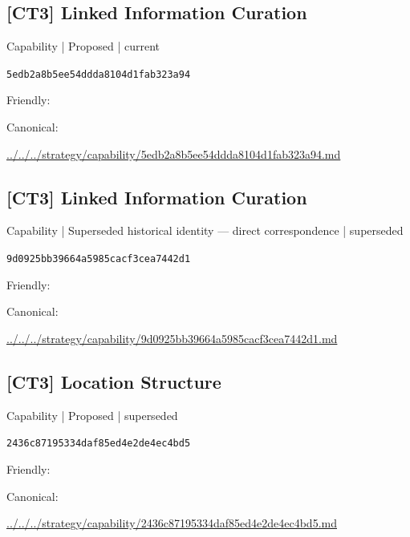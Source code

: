 \documentclass[10pt,a4paper]{article}
\begin{document}
\subsection*{[CT3] Linked Information Curation}
{\small Capability | Proposed | current}\par
\texttt{5edb2a8b5ee54ddda8104d1fab323a94}\par
Friendly: \par
Canonical: \par
{\footnotesize\url{../../../strategy/capability/5edb2a8b5ee54ddda8104d1fab323a94.md}}\par
\subsection*{[CT3] Linked Information Curation}
{\small Capability | Superseded historical identity — direct correspondence | superseded}\par
\texttt{9d0925bb39664a5985cacf3cea7442d1}\par
Friendly: \par
Canonical: \par
{\footnotesize\url{../../../strategy/capability/9d0925bb39664a5985cacf3cea7442d1.md}}\par
\subsection*{[CT3] Location Structure}
{\small Capability | Proposed | superseded}\par
\texttt{2436c87195334daf85ed4e2de4ec4bd5}\par
Friendly: \par
Canonical: \par
{\footnotesize\url{../../../strategy/capability/2436c87195334daf85ed4e2de4ec4bd5.md}}\par
\end{document}
